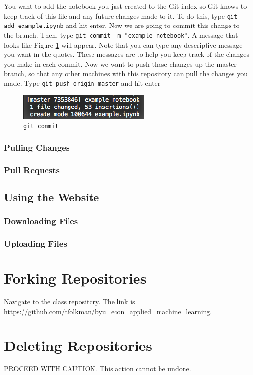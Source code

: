 \documentclass[11pt,a4paper]{article}
\begin{document}
You want to add the notebook you just created to the Git index so Git knows to keep track of this file and any future changes made to it.
To do this, type \texttt{git add example.ipynb} and hit enter.
Now we are going to commit this change to the branch.
Then, type \texttt{git commit -m "example notebook"}.
A message that looks like Figure \ref{fig:git-commit} will appear.
Note that you can type any descriptive message you want in the quotes.
These messages are to help you keep track of the changes you make in each commit.
Now we want to push these changes up the master branch, so that any other machines with this repository can pull the changes you made.
Type \texttt{git push origin master} and hit enter.

\begin{figure}[h]
\centering
\includegraphics[width=.4\textwidth]{figures/git_commit.png}
\caption{\texttt{git commit}}
\label{fig:git-commit}
\end{figure}

\subsubsection*{Pulling Changes}

\subsubsection*{Pull Requests}

\subsection*{Using the Website}
\subsubsection*{Downloading Files}

\subsubsection*{Uploading Files}

\section*{Forking Repositories}
Navigate to the class repository. 
The link is \url{https://github.com/tfolkman/byu_econ_applied_machine_learning}.

\section*{Deleting Repositories}
PROCEED WITH CAUTION.
This action cannot be undone.
\end{document}
